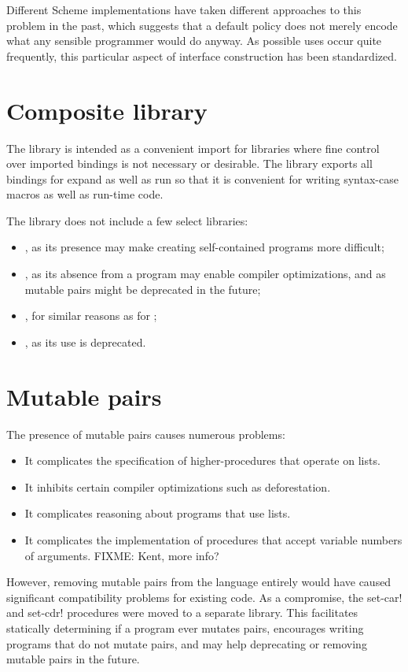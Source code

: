 \documentclass[twoside,twocolumn]{algol60}
\begin{document}
Different Scheme implementations have taken different approaches to
this problem in the past, which suggests that a default policy does
not merely encode what any sensible programmer would do anyway.  As
possible uses occur quite frequently, this particular aspect of
interface construction has been standardized.


\chapter{Composite library}

The \thersixlibrary{} library is intended as a convenient import for
libraries where fine control over imported bindings is not necessary
or desirable. The \thersixlibrary{} library exports all bindings for
{\cf expand} as well as {\cf run} so that it is convenient for writing
{\cf syntax-case} macros as well as run-time code.

The \rsixlibrary{} library does not include a few select libraries:
%
\begin{itemize}
\item {}, as its presence may make creating
  self-contained programs more difficult;
\item {}, as its absence from a program may enable compiler
  optimizations, and as mutable pairs might be deprecated in the future;
\item {}, for similar reasons as for
  ;
\item {}, as its use is deprecated.
\end{itemize}


\chapter{Mutable pairs}

The presence of mutable pairs causes numerous problems:
%
\begin{itemize}
\item It complicates the specification of higher-procedures that
  operate on lists.
\item It inhibits certain compiler optimizations such as
  deforestation.
\item It complicates reasoning about programs that use lists.
\item It complicates the implementation of procedures that accept
  variable numbers of arguments.  FIXME: Kent, more info?
\end{itemize}
%
However, removing mutable pairs from the language entirely would have
caused significant compatibility problems for existing code.  As a
compromise, the {\cf set-car!} and {\cf set-cdr!} procedures were
moved to a separate library.  This facilitates statically determining
if a program ever mutates pairs, encourages writing programs that do
not mutate pairs, and may help deprecating or removing mutable pairs
in the future.
\end{document}
